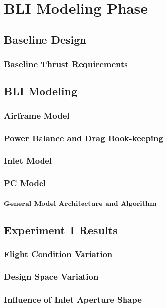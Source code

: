 \chapter{BLI Modeling Phase}

\section{Baseline Design}
\subsection{Baseline Thrust Requirements}
\section{BLI Modeling}
\subsection{Airframe Model}
\subsection{Power Balance and Drag Book-keeping}
\subsection{Inlet Model}
\subsection{PC Model}
\subsubsection{General Model Architecture and Algorithm}

\section{Experiment 1 Results}

\subsection{Flight Condition Variation}

\subsection{Design Space Variation}

\subsection{Influence of Inlet Aperture Shape}

